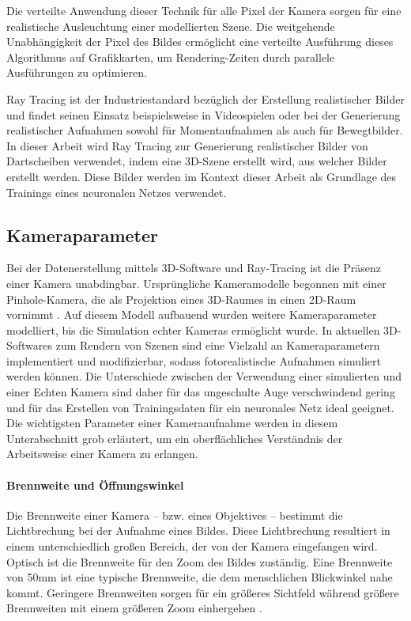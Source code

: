 Die verteilte Anwendung dieser Technik für alle Pixel der Kamera sorgen für eine realistische Ausleuchtung einer modellierten Szene. Die weitgehende Unabhängigkeit der Pixel des Bildes ermöglicht eine verteilte Ausführung dieses Algorithmus auf Grafikkarten, um Rendering-Zeiten durch parallele Ausführungen zu optimieren.

Ray Tracing ist der Industriestandard bezüglich der Erstellung realistischer Bilder und findet seinen Einsatz beispielsweise in Videospielen oder bei der Generierung realistischer Aufnahmen sowohl für Momentaufnahmen als auch für Bewegtbilder. In dieser Arbeit wird Ray Tracing zur Generierung realistischer Bilder von Dartscheiben verwendet, indem eine 3D-Szene erstellt wird, aus welcher Bilder erstellt werden. Diese Bilder werden im Kontext dieser Arbeit als Grundlage des Trainings eines neuronalen Netzes verwendet.


\subsection{Kameraparameter}
\label{sec:kameras}

Bei der Datenerstellung mittels 3D-Software und Ray-Tracing ist die Präsenz einer Kamera unabdingbar. Ursprüngliche Kameramodelle begonnen mit einer Pinhole-Kamera, die als Projektion eines 3D-Raumes in einen 2D-Raum vornimmt \cite{pinhole_camera}. Auf diesem Modell aufbauend wurden weitere Kameraparameter modelliert, bis die Simulation echter Kameras ermöglicht wurde. In aktuellen 3D-Softwares zum Rendern von Szenen sind eine Vielzahl an Kameraparametern implementiert und modifizierbar, sodass fotorealistische Aufnahmen simuliert werden können. Die Unterschiede zwischen der Verwendung einer simulierten und einer Echten Kamera sind daher für das ungeschulte Auge verschwindend gering und für das Erstellen von Trainingsdaten für ein neuronales Netz ideal geeignet. Die wichtigsten Parameter einer Kameraaufnahme werden in diesem Unterabschnitt grob erläutert, um ein oberflächliches Verständnis der Arbeitsweise einer Kamera zu erlangen.

\paragraph{Brennweite und Öffnungswinkel}

Die Brennweite einer Kamera -- bzw. eines Objektives -- bestimmt die Lichtbrechung bei der Aufnahme eines Bildes. Diese Lichtbrechung resultiert in einem unterschiedlich großen Bereich, der von der Kamera eingefangen wird. Optisch ist die Brennweite für den Zoom des Bildes zuständig. Eine Brennweite von 50mm ist eine typische Brennweite, die dem menschlichen Blickwinkel nahe kommt. Geringere Brennweiten sorgen für ein größeres Sichtfeld während größere Brennweiten mit einem größeren Zoom einhergehen \cite{focal_lentgh}.


